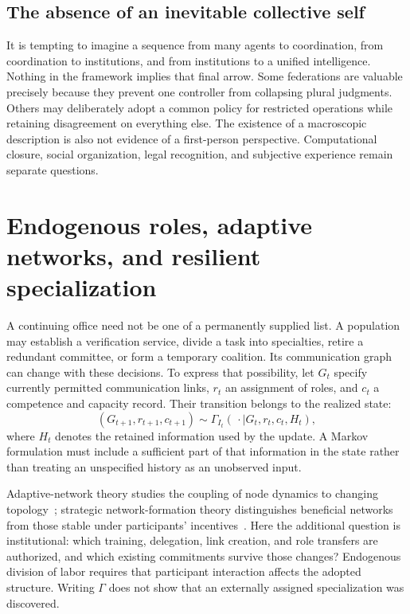 \subsection{The absence of an inevitable collective self}

It is tempting to imagine a sequence from many agents to coordination, from coordination to institutions, and from institutions to a unified intelligence. Nothing in the framework implies that final arrow. Some federations are valuable precisely because they prevent one controller from collapsing plural judgments. Others may deliberately adopt a common policy for restricted operations while retaining disagreement on everything else. The existence of a macroscopic description is also not evidence of a first-person perspective. Computational closure, social organization, legal recognition, and subjective experience remain separate questions.

\section{Endogenous roles, adaptive networks, and resilient specialization}\label{MS:sec:specialization}

A continuing office need not be one of a permanently supplied list. A population may establish a verification service, divide a task into specialties, retire a redundant committee, or form a temporary coalition. Its communication graph can change with these decisions. To express that possibility, let $G_t$ specify currently permitted communication links, $r_t$ an assignment of roles, and $c_t$ a competence and capacity record. Their transition belongs to the realized state:
\[
(G_{t+1},r_{t+1},c_{t+1})\sim
\Gamma_{I_t}(\,\cdot\mid G_t,r_t,c_t,H_t),
\]
where $H_t$ denotes the retained information used by the update. A Markov formulation must include a sufficient part of that information in the state rather than treating an unspecified history as an unobserved input.

Adaptive-network theory studies the coupling of node dynamics to changing topology~\cite{MS:grossblasius}; strategic network-formation theory distinguishes beneficial networks from those stable under participants' incentives~\cite{MS:jacksonwolinsky}. Here the additional question is institutional: which training, delegation, link creation, and role transfers are authorized, and which existing commitments survive those changes? Endogenous division of labor requires that participant interaction affects the adopted structure. Writing $\Gamma$ does not show that an externally assigned specialization was discovered.

